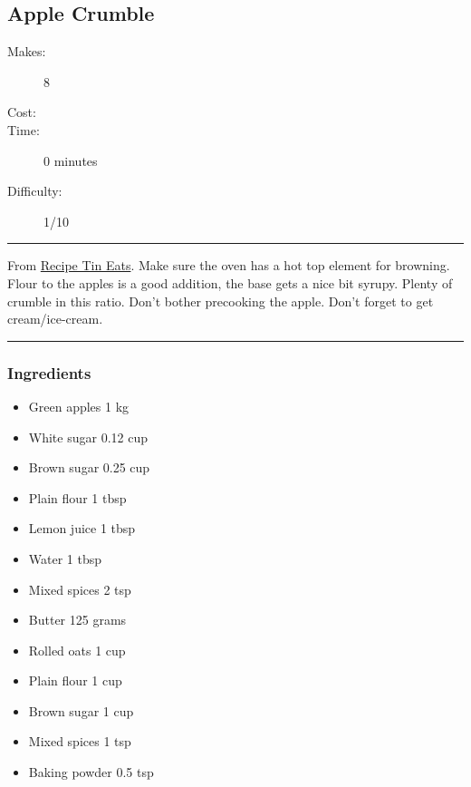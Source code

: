 \documentclass[]{article}
\begin{document}
\subsection*{\center\huge Apple Crumble}
\begin{description}
\item[Makes:] 8 
\item[Cost:] \textdollar
\item[Time:] 0 minutes
\item[Difficulty:] 1/10
\end{description}
\vspace{0.2cm}\hrule\vspace{0.5cm}
\begin{adjustwidth}{0.5 cm}{0.5 cm}

From \href{https://www.recipetineats.com/apple-crumble/}{Recipe Tin Eats}. Make sure the oven has a hot top element for browning. Flour to the apples is a good addition, the base gets a nice bit syrupy. Plenty of crumble in this ratio. Don’t bother precooking the apple. Don’t forget to get cream/ice-cream. \hfill{}\color{black}

\end{adjustwidth}
\vspace{0.5cm}\hrule
\subsubsection*{\Large Ingredients}
\begin{multicols}{2}
\begin{itemize}
 \item Green apples \hfill 1 kg
 \item White sugar \hfill 0.12 cup
 \item Brown sugar \hfill 0.25 cup
 \item Plain flour \hfill 1 tbsp
 \item Lemon juice \hfill 1 tbsp
 \item Water \hfill 1 tbsp
 \item Mixed spices \hfill 2 tsp
 \item Butter \hfill 125 grams
 \item Rolled oats \hfill 1 cup
 \item Plain flour \hfill 1 cup
 \item Brown sugar \hfill 1 cup
 \item Mixed spices \hfill 1 tsp
 \item Baking powder \hfill 0.5 tsp
\end{itemize}
\end{multicols}
\end{document}
